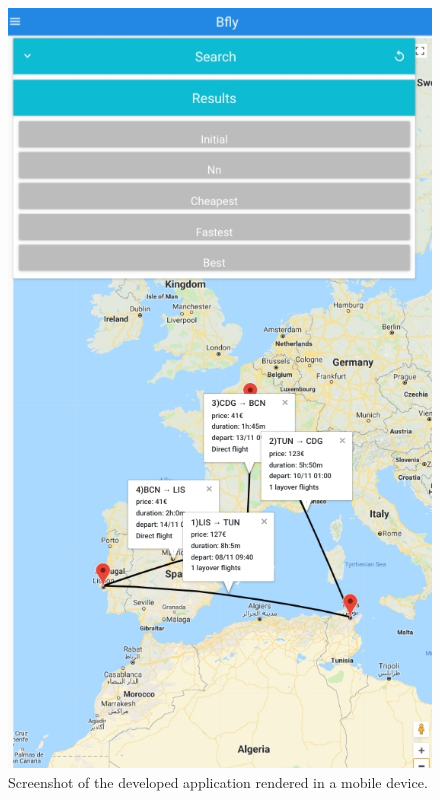\begin{figure}[htpb]
  \centering
  \includegraphics[width=\textwidth]{./imgs/bfly_mobile.jpg}
  \caption{Screenshot of the developed application rendered in a mobile device.}
  \label{fig:mobile_app}  
\end{figure}